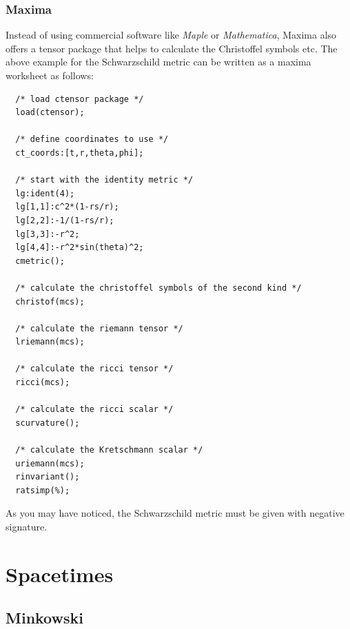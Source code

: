 \documentclass[10pt,twoside,notitlepage,a4paper,fleqn,openbib]{report}
\newcommand{\verbfont}{\fontsize{7}{9}\selectfont}
\begin{document}
\subsection{Maxima}
Instead of using commercial software like {\sl Maple} or {\sl Mathematica}, Maxima also offers a tensor package that helps to calculate the Christoffel symbols etc. The above example for the Schwarz\-schild metric can be written as a maxima worksheet as follows:
{\verbfont
\begin{verbatim}
  /* load ctensor package */
  load(ctensor);

  /* define coordinates to use */
  ct_coords:[t,r,theta,phi];

  /* start with the identity metric */
  lg:ident(4);
  lg[1,1]:c^2*(1-rs/r);
  lg[2,2]:-1/(1-rs/r);
  lg[3,3]:-r^2;
  lg[4,4]:-r^2*sin(theta)^2;
  cmetric();

  /* calculate the christoffel symbols of the second kind */
  christof(mcs);

  /* calculate the riemann tensor */
  lriemann(mcs);

  /* calculate the ricci tensor */
  ricci(mcs);

  /* calculate the ricci scalar */
  scurvature();

  /* calculate the Kretschmann scalar */
  uriemann(mcs);
  rinvariant();
  ratsimp(%);
\end{verbatim}
}

As you may have noticed, the Schwarzschild metric must be given with negative signature.

\chapter{Spacetimes}
\section{Minkowski}
\setcounter{equation}{0}

\clearpage
\end{document}

